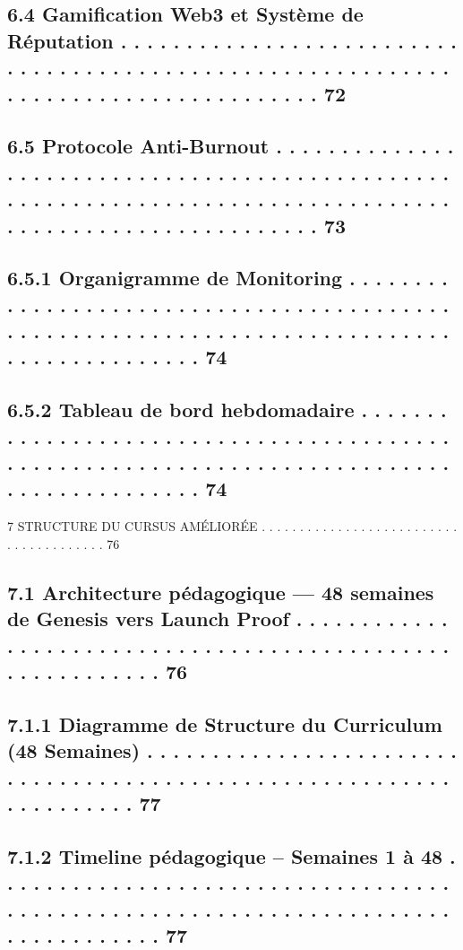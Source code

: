 \subsection{6.4     Gamification Web3 et Système de Réputation . . . . . . . . . . . . . . . . . . . . . . . . . . . . . . . . . . . . . . . . . . . . . . . . . . . . . . . . . . . . . . . . . . . . . . . . . . . . . . . . . . . . 72}
\subsection{6.5     Protocole Anti-Burnout . . . . . . . . . . . . . . . . . . . . . . . . . . . . . . . . . . . . . . . . . . . . . . . . . . . . . . . . . . . . . . . . . . . . . . . . . . . . . . . . . . . . . . . . . . . . . . . . . . . . . . . . . . 73}
\subsection{6.5.1              Organigramme de Monitoring . . . . . . . . . . . . . . . . . . . . . . . . . . . . . . . . . . . . . . . . . . . . . . . . . . . . . . . . . . . . . . . . . . . . . . . . . . . . . . . . . . . . . . . . . . . 74}
\subsection{6.5.2              Tableau de bord hebdomadaire . . . . . . . . . . . . . . . . . . . . . . . . . . . . . . . . . . . . . . . . . . . . . . . . . . . . . . . . . . . . . . . . . . . . . . . . . . . . . . . . . . . . . . . . . . 74}
\vspace{0.5em}
7     STRUCTURE DU CURSUS AMÉLIORÉE . . . . . . . . . . . . . . . . . . . . . . . . . . . . . . . . . . . . . . . 76\\
\subsection{7.1     Architecture pédagogique — 48 semaines de Genesis vers Launch Proof . . . . . . . . . . . . . . . . . . . . . . . . . . . . . . . . . . . . . . . . . . . . . . . . . . . . . . . . . . 76}
\subsection{7.1.1              Diagramme de Structure du Curriculum (48 Semaines) . . . . . . . . . . . . . . . . . . . . . . . . . . . . . . . . . . . . . . . . . . . . . . . . . . . . . . . . . . . . . . . . . . . . 77}
\subsection{7.1.2              Timeline pédagogique – Semaines 1 à 48 . . . . . . . . . . . . . . . . . . . . . . . . . . . . . . . . . . . . . . . . . . . . . . . . . . . . . . . . . . . . . . . . . . . . . . . . . . . . . . . . . 77}
